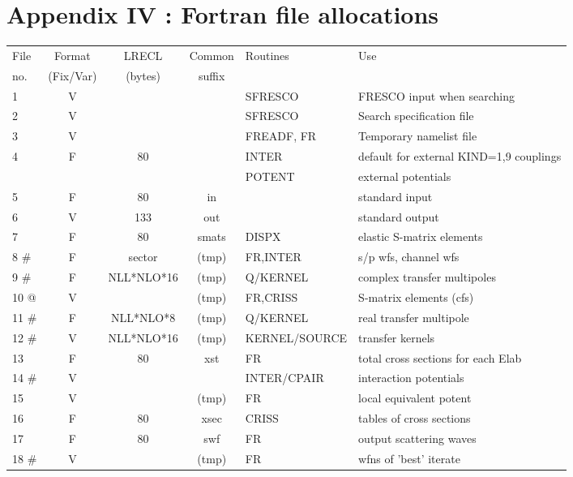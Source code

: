 \documentclass[11pt]{article}
\begin{document}
\section*{Appendix IV : {\sc Fortran} file allocations}
%
\begin{tabular}{|l | c c c | l | l|}
\hline
File & Format & LRECL  & Common & Routines & Use \\
 no. & (Fix/Var) & (bytes) &suffix &  &  \\
\hline
1    &  V &             &     &     SFRESCO& FRESCO input when searching\\
2    &  V &             &    &     SFRESCO& Search specification file\\
3    &  V &             &    &     FREADF, FR& Temporary namelist file\\
4    &  F &     80      &    &     INTER & default for external KIND=1,9 couplings\\
     &    &             &    &     POTENT &external potentials\\
5    &  F &     80      & in  &         &   standard input\\
6    &  V &    133      & out  &          &  standard output\\
7    &  F &     80      & smats &     DISPX & elastic S-matrix elements\\
8  \# &  F &   sector    &   (tmp) &     FR,INTER & s/p wfs, channel wfs\\
9  \# &  F &  NLL*NLO*16    &  (tmp)& Q/KERNEL &  complex transfer multipoles\\
10  @ &  V &             &  (tmp)  &     FR,CRISS & S-matrix elements (cfs)\\
11  \# &  F & NLL*NLO*8 &  (tmp) & Q/KERNEL &  real transfer multipole\\
12  \# &  V &NLL*NLO*16 & (tmp)  &   KERNEL/SOURCE&transfer kernels\\
13    &  F &    80      & xst  &      FR   &    total cross sections for each Elab\\
14  \#  & V &             &    &   INTER/CPAIR &interaction potentials\\
15    &  V &           & (tmp)  &       FR   &   local equivalent potent\\
16    &  F &     80      & xsec  &       CRISS &  tables of cross sections\\
17    &  F &     80      & swf  &       FR  &    output scattering waves\\
18  \# &  V &             & (tmp)  &       FR  &    wfns of 'best' iterate\\

\end{tabular}
\end{document}
